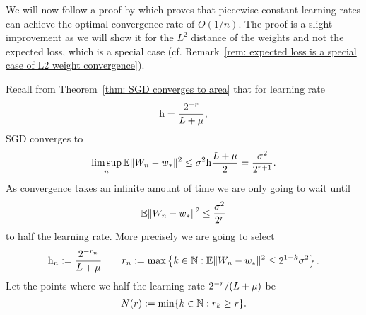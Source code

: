 We will now follow a proof by \textcite[pp. 27-28]{bottouOptimizationMethodsLargeScale2018}
which proves that piecewise constant learning rates can achieve the optimal
convergence rate of \(O(1/n)\). The proof is a slight improvement as we will
show it for the \(L^2\) distance of the weights and not the expected loss, which
is a special case (cf.  Remark~\ref{rem: expected loss is a special case of L2
weight convergence}).

Recall from Theorem~\ref{thm: SGD converges to area} that for learning rate
\begin{align*}
	\text{h} = \frac{2^{-r}}{L+\mu},
\end{align*}
SGD converges to
\begin{align*}
	\limsup_{n}\mathbb{E}\|W_n - w_*\|^2
	\le \sigma^2 \text{h} \frac{L+\mu}{2} = \frac{\sigma^2}{2^{r+1}}.
\end{align*}
As convergence takes an infinite amount of time we are only going to wait until
\begin{align*}
	\mathbb{E}\|W_n -w_*\|^2 \le \frac{\sigma^2}{2^r}
\end{align*}
to half the learning rate. More precisely we are going to select 
\begin{align}\label{eq: piecewise constant learning rates}
	\text{h}_n := \frac{2^{-r_n}}{L+\mu}
	\qquad	
	r_n := \max\left\{k\in\mathbb{N} : \mathbb{E}\|W_n-w_*\|^2 \le 2^{1-k}\sigma^2\right\}.
\end{align}
Let the points where we half the learning rate
\(2^{-r}/(L+\mu)\) be 
\begin{align*}
	N(r) := \min\{k\in\mathbb{N} : r_k \ge r\}.
\end{align*}

